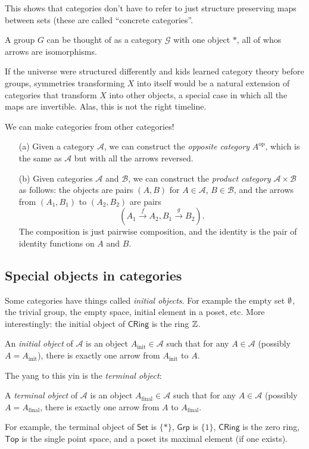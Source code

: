 This shows that categories don't have to refer to just structure preserving maps between sets (these are called ``concrete categories''.
\begin{example}
   A group $G $ can be thought of as a category $\mathcal{G} $ with one object $*$, all of whos arrows are isomorphisms. 

            If the universe were structured differently and kids learned category theory before groups, symmetries transforming $X$ into itself would be a natural extension of categories that transform $X$ into other objects, a special case in which all the maps are invertible. Alas, this is not the right timeline.
\end{example}
\begin{example}
We can make categories from other categories!
   \begin{enumerate}
       \item[(a)] Given a category $\mathcal{A} $, we can construct the \emph{opposite category} $A^{\text{op}}$, which is the same as $\mathcal{A} $ but with all the arrows reversed.
       \item[(b)] Given categories $\mathcal{A} $ and $\mathcal{B} $, we can construct the \emph{product category}  $\mathcal{A} \times \mathcal{B} $ as follows: the objects are pairs $(A,B)$ for $A\in \mathcal{A} $, $B\in \mathcal{B} $, and the arrows from $(A_1,B_1)$ to $(A_2,B_2)$ are pairs \[
               \left( A_1 \overset{f}{\to }A_2, B_1\overset{g}{\to }B_2 \right) .
       \] The composition is just pairwise composition, and the identity is the pair of identity functions on $A$ and $B$.
   \end{enumerate} 
\end{example}

\subsection{Special objects in categories}
Some categories have things called \emph{initial objects}. For example the empty set $\emptyset$, the trivial group, the empty space, initial element in a poset, etc. More interestingly: the initial object of $\mathsf{CRing} $ is the ring $\mathbb{Z}$.
\begin{definition}
    An \emph{initial object} of $\mathcal{A} $ is an object $A_{\text{init}}\in \mathcal{A} $ such that for any $A\in \mathcal{A} $ (possibly $A=A_{\text{init}}$), there is exactly one arrow from $A_{\text{init}}$ to $A$.
\end{definition}
The yang to this yin is the \emph{terminal object}:
\begin{definition}
    A \emph{terminal object} of $\mathcal{A} $ is an object $A_{\text{final}}\in \mathcal{A} $ such that for any $A\in \mathcal{A} $ (possibly $A=A_{\text{final}}$, there is exactly one arrow from $A$ to $A_{\text{final}}$. 
\end{definition}
For example, the terminal object of $\mathsf{Set} $ is $\{*\} $, $\mathsf{Grp} $ is $\{1\} $, $\mathsf{CRing} $ is the zero ring, $\mathsf{Top} $ is the single point space, and a poset its maximal element (if one exists).

